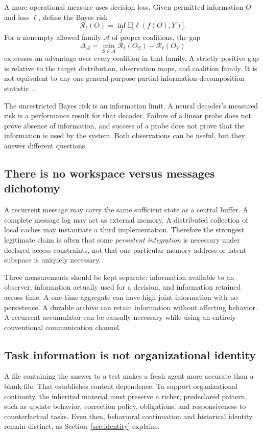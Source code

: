 \documentclass[11pt,letterpaper]{article}
\theoremstyle{plain}
\theoremstyle{definition}
\theoremstyle{remark}
\newcommand{\E}{\mathbb E}
\begin{document}
A more operational measure uses decision loss. Given permitted information $O$ and loss $\ell$, define the Bayes risk
\[
\mathcal R_\ell(O)=\inf_f\E\bigl[\ell(f(O),Y)\bigr].
\]
For a nonempty allowed family $\mathcal A$ of proper coalitions, the gap
\begin{equation}\label{eq:coalition}
\Delta_{\mathcal A}=\min_{S\in\mathcal A}\mathcal R_\ell(O_S)
-\mathcal R_\ell(O_V)
\end{equation}
expresses an advantage over every coalition in that family. A strictly positive gap is relative to the target distribution, observation maps, and coalition family. It is not equivalent to any one general-purpose partial-information-decomposition statistic~\cite{williams}.

The unrestricted Bayes risk is an information limit. A neural decoder's measured risk is a performance result for that decoder. Failure of a linear probe does not prove absence of information, and success of a probe does not prove that the information is used by the system. Both observations can be useful, but they answer different questions.

\subsection{There is no workspace versus messages dichotomy}
A recurrent message may carry the same sufficient state as a central buffer. A complete message log may act as external memory. A distributed collection of local caches may instantiate a third implementation. Therefore the strongest legitimate claim is often that some \emph{persistent integration} is necessary under declared access constraints, not that one particular memory address or latent subspace is uniquely necessary.

Three measurements should be kept separate: information available to an observer, information actually used for a decision, and information retained across time. A one-time aggregate can have high joint information with no persistence. A durable archive can retain information without affecting behavior. A recurrent accumulator can be causally necessary while using an entirely conventional communication channel.

\subsection{Task information is not organizational identity}
A file containing the answer to a test makes a fresh agent more accurate than a blank file. That establishes content dependence. To support organizational continuity, the inherited material must preserve a richer, predeclared pattern, such as update behavior, correction policy, obligations, and responsiveness to counterfactual tasks. Even then, behavioral continuation and historical identity remain distinct, as Section~\ref{sec:identity} explains.
\end{document}
